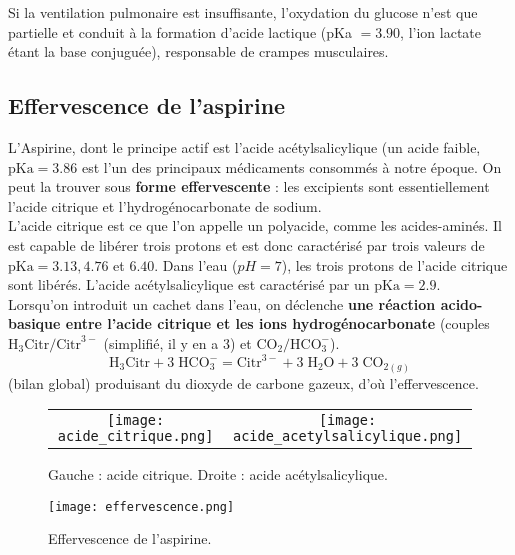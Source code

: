 \documentclass[11pt,a4paper]{report}
\begin{document}
Si la ventilation pulmonaire est insuffisante, l'oxydation du glucose n'est que partielle et conduit à la formation d'acide lactique (pKa $= 3.90$, l'ion lactate étant la base conjuguée), responsable de crampes musculaires.

\subsection{Effervescence de l'aspirine}

L'Aspirine, dont le principe actif est l'acide acétylsalicylique (un acide faible, $\text{pKa} = 3.86$ est l'un des principaux médicaments consommés à notre époque. On peut la trouver sous \textbf{forme effervescente} : les excipients sont essentiellement l'acide citrique et l'hydrogénocarbonate de sodium.\\ 

L'acide citrique est ce que l'on appelle un polyacide, comme les acides-aminés. Il est capable de libérer trois protons et est donc caractérisé par trois valeurs de $\text{pKa} = 3.13, 4.76$ et $6.40$. Dans l'eau ($pH = 7$), les trois protons de l'acide citrique sont libérés. L'acide acétylsalicylique est caractérisé par un $\text{pKa} = 2.9$.\\ 

Lorsqu'on introduit un cachet dans l'eau, on déclenche \textbf{une réaction acido-basique entre l'acide citrique et les ions hydrogénocarbonate} (couples $\text{H}_3\text{Citr}/\text{Citr}^{3-}$ (simplifié, il y en a 3) et $\text{CO}_2/\text{HCO}_3^-$).
\begin{equation}
\text{H}_3\text{Citr}+3\;\text{HCO}_3^-=\text{Citr}^{3-}+3\;\text{H}_2\text{O}+3\;\text{CO}_{2(g)}
\end{equation}
(bilan global) produisant du dioxyde de carbone gazeux, d'où l'effervescence.\\

\begin{figure}[h!]
	\begin{center}
		\begin{tabular}{cc}
  		\texttt{[image: acide\_citrique.png]} &
   		\texttt{[image: acide\_acetylsalicylique.png]}\\
	\end{tabular}
	\caption{Gauche : acide citrique. Droite : acide acétylsalicylique.}
	\end{center}
\end{figure}

\begin{figure}[h!]
	\begin{center}
  		\texttt{[image: effervescence.png]}
	\caption{Effervescence de l'aspirine.}
	\end{center}
\end{figure}
\end{document}
